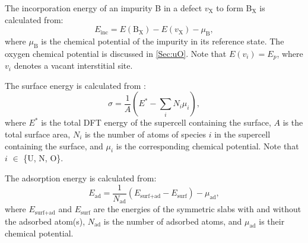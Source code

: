 \documentclass[preprint,12pt,sort&compress]{elsarticle}
\newcommand{\?}{\stackrel{?}{=}}
\begin{document}
The incorporation energy of an impurity B in a defect $v_\text{X}$ to form B$_\text{X}$ is calculated from:
\begin{equation}
E_\text{inc} = E( \text{B}_\text{X} ) - E( v_\text{X} ) - \mu_\text{B},
\end{equation}
where $\mu_\text{B}$ is the chemical potential of the impurity in its reference state. The oxygen chemical potential is discussed in \cref{Sec:uO}. Note that $E( v_i ) = E_p$, where $v_i$ denotes a vacant interstitial site. %

The surface energy is calculated from \cite{Finnis2005}:
\begin{equation}
\sigma = \frac{1}{A} \left( E^* - \sum_{i} N_i \mu_i \right),
\label{Eq:Sigma}
\end{equation}
where $E^*$ is the total DFT energy of the supercell containing the surface, $A$ is the total surface area, $N_i$ is the number of atoms of species $i$ in the supercell containing the surface, and $\mu_i$ is the corresponding chemical potential. Note that $i$ $\in$ \{U, N, O\}.

The adsorption energy is calculated from:
\begin{equation}
E_\text{ad} = \frac{1}{N_\text{ad}} \left( E_\text{surf+ad} - E_\text{surf} \right) - \mu_\text{ad},
\label{Eq:Ead}
\end{equation}
where $E_\text{surf+ad}$ and $E_\text{surf}$ are the energies of the symmetric slabs with and without the adsorbed atom(s), $N_\text{ad}$ is the number of adsorbed atoms, and $\mu_\text{ad}$ is their chemical potential. 
\end{document}
